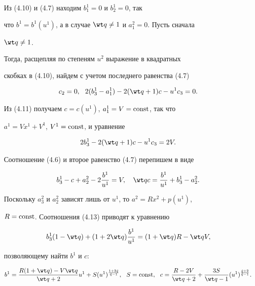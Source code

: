  


Из (4.10) и (4.7) находим $b^1_1=0$ и $b^1_2=0$, так 


что $b^1=b^1(u^1)$, а в случае $\wt q\ne1$ и $a^2_1=0$. Пусть сначала 


$\wt q\ne1$. 


Тогда, расщепляя по степеням $u^2$ выражение в квадратных 


скобках в (4.10), найдем с учетом последнего равенства (4.7) 


\begin{equation} 


c_2=0,\ \ 2(b^1_3-a^1_1)-2(\wt q+1)c-u^1c_3=0. 


\end{equation} 


Из (4.11) получаем $c=c(u^1)$, $a^1_1=V=\operatorname{const}$, так что 


$a^1=Vx^1+V^1$, $V^1=\operatorname{const}$, и уравнение 


\begin{equation} 


2b^1_3-2(\wt q+1)c-u^1c_3=2V. 


\end{equation} 


Соотношение (4.6) и второе равенство (4.7) перепишем в виде 


\begin{equation} 


b^1_3-c+a^2_2-2\frac{b^1}{u^1}=V,\quad 


\wt qc=\frac{b^1}{u^1}+b^1_3-a^2_2. 


\end{equation} 


Поскольку $a^2_3$ и $a^2_2$ зависят лишь от $u^1$, то $a^2=Rx^2+p(u^1)$, 


$R=\operatorname{const}$. Соотношения (4.13) приводят к уравнению 


\begin{equation} 


b^1_3(1-\wt q)+(1+2\wt q)\frac{b^1}{u^1}=(1+\wt q)R-\wt qV, 


\end{equation} 


позволяющему найти $b^1$ и $c$: 


\begin{equation} 


b^1=\frac{R(1+\wt q)-V\wt q}{\wt q+2}u^1+ 


S(u^1)^{\frac{1+2\Tilde q}{\Tilde q-1}},\ \ S=\const,\ \ 


c=\frac{R-2V}{\wt q+2}+\frac{3S}{\wt q-1} 


(u^1)^{\frac{\Tilde q+2}{\Tilde q-1}}. 


\end{equation} 


